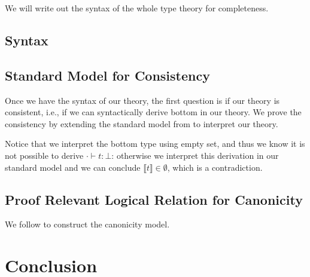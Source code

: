 We will write out the syntax of the whole type theory for completeness.


\newcommand{\denotes}[1]{{\llbracket {#1} \rrbracket}}
\newcommand{\goodCtx}[2]{{ {#1} \ ok }}
\newcommand{\goodType}[3]{{ {#1} \vdash {#2} }}
\newcommand{\goodTerm}[3]{{ {#1} \vdash {#2} : {#3} }}
\newcommand{\goodSub}[3]{{ {#1} \vdash {#2} : {#3} }}
\newcommand{\goodSig}[3]{{ {#1} \vdash {#2} \ \  Sig^{#3} }}
\newcommand{\goodWSig}[3]{{ {#1} \vdash {#2} \ \ WSig^{#3} }}
\newcommand{\goodSeal}[3]{{ {#1} \vdash {#2} \  |\  {#3} }}
\newcommand{\goodInh}[3]{{ {#1} \vdash {#2} \twoheadrightarrow {#3}}}
\newcommand{\nat}{\mathbf{N}}

\newcommand{\cU}{{\mathcal{U}}}
\newcommand{\cB}{{\mathbb{B}}}


\subsection{Syntax}





\subsection{Standard Model for Consistency}
Once we have the syntax of our theory, the first question is if our theory is consistent, i.e., if we can syntactically derive bottom in our theory. We prove the consistency by extending the standard model from \citep{kaposi2017type} to interpret our theory. 


Notice that we interpret the bottom type using empty set, and thus we know it is not possible to derive $\cdot \vdash t : \bot$: otherwise we interpret this derivation in our standard model and we can conclude $\denotes{t} \in \emptyset$, which is a contradiction.


\subsection{Proof Relevant Logical Relation for Canonicity}
We follow \citep{sterling2019algebraic,coquand2018canonicity} to construct the canonicity model. 


\section{Conclusion}
\label{sec:conclusion}

\setlength{\bibsep}{.8ex}


